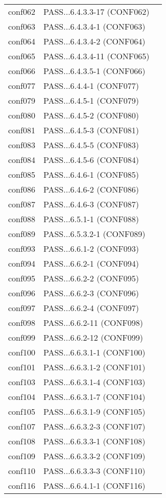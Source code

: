 \begin{tabular}{llc}
  conf062& PASS...6.4.3.3-17 (CONF062)&\\
  conf063& PASS...6.4.3.4-1 (CONF063)&\\
  conf064& PASS...6.4.3.4-2 (CONF064)&\\
  conf065& PASS...6.4.3.4-11 (CONF065)&\\
  conf066& PASS...6.4.3.5-1 (CONF066)&\\
  conf077& PASS...6.4.4-1 (CONF077)&\\
  conf079& PASS...6.4.5-1 (CONF079)&\\
  conf080& PASS...6.4.5-2 (CONF080)&\\
  conf081& PASS...6.4.5-3 (CONF081)&\\
  conf083& PASS...6.4.5-5 (CONF083)&\\
  conf084& PASS...6.4.5-6 (CONF084)&\\
  conf085& PASS...6.4.6-1 (CONF085)&\\
  conf086& PASS...6.4.6-2 (CONF086)&\\
  conf087& PASS...6.4.6-3 (CONF087)&\\
  conf088& PASS...6.5.1-1 (CONF088)&\\
  conf089& PASS...6.5.3.2-1 (CONF089)&\\
  conf093& PASS...6.6.1-2 (CONF093)&\\
  conf094& PASS...6.6.2-1 (CONF094)&\\
  conf095& PASS...6.6.2-2 (CONF095)&\\
  conf096& PASS...6.6.2-3 (CONF096)&\\
  conf097& PASS...6.6.2-4 (CONF097)&\\
  conf098& PASS...6.6.2-11 (CONF098)&\\
  conf099& PASS...6.6.2-12 (CONF099)&\\
  conf100& PASS...6.6.3.1-1 (CONF100)&\\
  conf101& PASS...6.6.3.1-2 (CONF101)&\\
  conf103& PASS...6.6.3.1-4 (CONF103)&\\
  conf104& PASS...6.6.3.1-7 (CONF104)&\\
  conf105& PASS...6.6.3.1-9 (CONF105)&\\
  conf107& PASS...6.6.3.2-3 (CONF107)&\\
  conf108& PASS...6.6.3.3-1 (CONF108)&\\
  conf109& PASS...6.6.3.3-2 (CONF109)&\\
  conf110& PASS...6.6.3.3-3 (CONF110)&\\
  conf116& PASS...6.6.4.1-1 (CONF116)&\\

\end{tabular}
